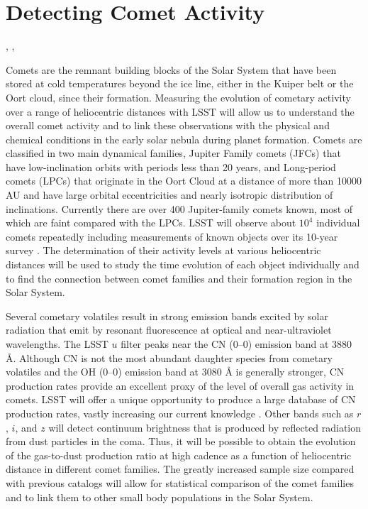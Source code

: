 %
%

\section{Detecting Comet Activity}
\def\secname{\chpname:activity}\label{sec:\secname}

,
,

Comets are the remnant building blocks of the Solar System
that have been stored at cold temperatures beyond the ice
line, either in the Kuiper belt or the Oort cloud, since their
formation.  Measuring the evolution of cometary activity over
a range of heliocentric distances with LSST will allow us to
understand the overall comet activity and to link these
observations with the physical and chemical conditions in the
early solar nebula during planet formation.  Comets are
classified in two main dynamical families, Jupiter Family
comets (JFCs) that have low-inclination orbits with periods
less than 20 years, and Long-period comets (LPCs) that
originate in the Oort Cloud at a distance of more than 10000
AU and have large orbital eccentricities and nearly isotropic
distribution of inclinations.  Currently there are over 400
Jupiter-family comets known, most of which are faint compared
with the LPCs.  LSST will observe about $10^4$ individual
comets repeatedly including measurements of known objects over
its 10-year survey \citep{2010PhDT.......241S}. The
determination of their activity levels at various heliocentric
distances will be used to study the time evolution of each
object individually and to find the connection between comet
families and their formation region in the Solar System.

Several cometary volatiles result in strong emission bands
excited by solar radiation that emit by resonant fluorescence
at optical and near-ultraviolet wavelengths.  The LSST $u$
filter peaks near the CN (0--0) emission band at 3880 \r{A}.
Although CN is not the most abundant daughter species from
cometary volatiles and the OH (0--0) emission band at 3080
\r{A} is generally stronger, CN production rates provide an
excellent proxy of the level of overall gas activity in
comets. LSST will offer a unique opportunity to produce
a large database of CN production rates, vastly increasing our current
knowledge \citep[see
e.g.][]{1995Icar..118..223A, 2012ApJ...758...29A}.
 Other bands such as $r$, $i$, and $z$ will detect
continuum brightness that is produced by reflected radiation
from dust particles in the coma. Thus, it will be possible to
obtain the evolution of the gas-to-dust production ratio at
high cadence as a function of heliocentric distance in
different comet families. The greatly increased sample size
compared with previous catalogs \citep{1995Icar..118..223A}
will allow for statistical comparison of the comet families
and to link them to other small body populations in the Solar
System.


